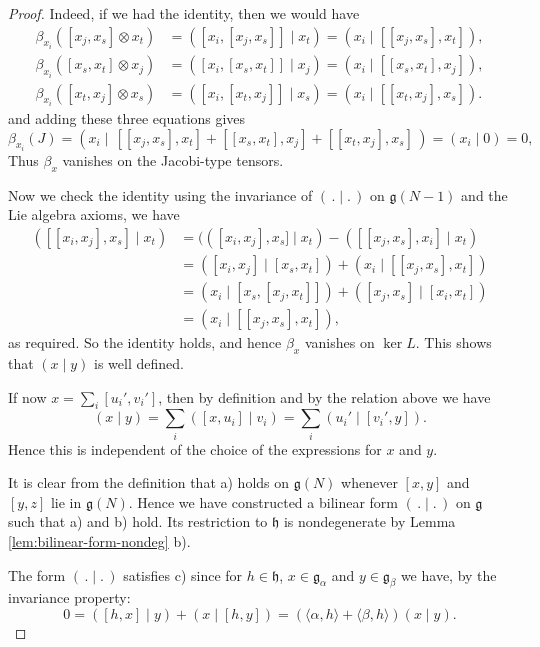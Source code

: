 \documentclass[12pt]{article}
\begin{document}
\begin{proof}
    Indeed, if we had the identity, then we would have
    \begin{align*}
        \beta_{x_i}([x_j,x_s]\otimes x_t)
         & =([x_i,[x_j,x_s]]\mid x_t)
        =(x_i\mid [[x_j,x_s],x_t]),   \\
        \beta_{x_i}([x_s,x_t]\otimes x_j)
         & =([x_i,[x_s,x_t]]\mid x_j)
        =(x_i\mid [[x_s,x_t],x_j]),   \\
        \beta_{x_i}([x_t,x_j]\otimes x_s)
         & =([x_i,[x_t,x_j]]\mid x_s)
        =(x_i\mid [[x_t,x_j],x_s]).
    \end{align*}
    and adding these three equations gives
    \[
        \beta_{x_i}(J)
        =(x_i\mid \,[[x_j,x_s],x_t]+[[x_s,x_t],x_j]+[[x_t,x_j],x_s]\,)
        = (x_i\mid 0)=0,
    \] Thus $\beta_x$ vanishes on the Jacobi-type tensors.

    Now we check the identity using the invariance of $(\,.\mid.\,)$ on $\mathfrak{g}(N-1)$ and the Lie algebra axioms, we have
    \begin{align*}
        ([[x_i,x_j],x_s]\mid x_t)
         & = (([x_i,x_j],x_s] \mid x_t) - ([ [x_j,x_s],x_i]\mid x_t) \\
         & = ([x_i,x_j]\mid [x_s,x_t]) + (x_i \mid [[x_j,x_s],x_t])  \\
         & = (x_i \mid [x_s,[x_j,x_t]]) + ([x_j,x_s]\mid [x_i,x_t])  \\
         & = (x_i \mid [[x_j,x_s],x_t]),
    \end{align*}
    as required. So the identity holds, and hence $\beta_x$ vanishes on $\ker L$. This shows that $(x\mid y)$ is well defined.

    If now $x=\sum_i [u_i',v_i']$, then by definition and by the relation above we have
    \[
        (x \mid y) = \sum_i ([x,u_i]\mid v_i)
        = \sum_i (u_i' \mid [v_i',y]).
    \]
    Hence this is independent of the choice of the expressions for $x$ and $y$.

    It is clear from the definition that a) holds on $\mathfrak{g}(N)$ whenever $[x,y]$ and $[y,z]$
    lie in $\mathfrak{g}(N)$. Hence we have constructed a bilinear form $(\,.\mid.\,)$ on $\mathfrak{g}$
    such that a) and b) hold. Its restriction to $\mathfrak{h}$ is nondegenerate by Lemma \ref{lem:bilinear-form-nondeg} b).

    The form $(\,.\mid.\,)$ satisfies c) since for $h \in \mathfrak{h}$, $x \in \mathfrak{g}_\alpha$ and $y \in \mathfrak{g}_\beta$ we have, by the invariance property:
    \[
        0 = ([h,x]\mid y) + (x \mid [h,y])
        = (\langle \alpha,h\rangle + \langle \beta,h\rangle)(x \mid y).
    \]


\end{proof}
\end{document}
